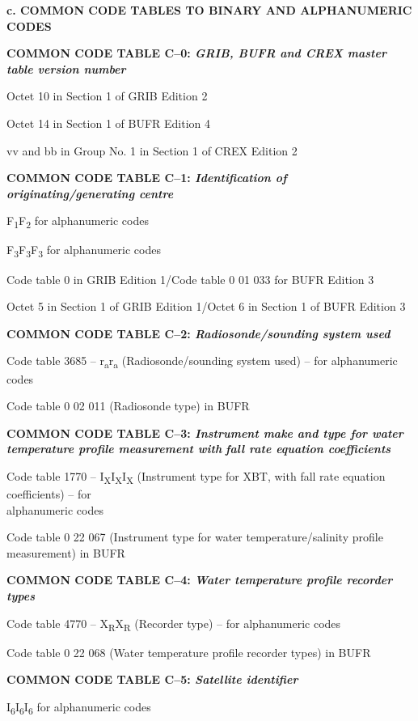 \textbf{c. COMMON CODE TABLES TO BINARY AND ALPHANUMERIC CODES}

\textbf{COMMON CODE TABLE C--0: \emph{GRIB, BUFR and CREX master table version number}}

Octet 10 in Section 1 of GRIB Edition 2

Octet 14 in Section 1 of BUFR Edition 4

vv and bb in Group No. 1 in Section 1 of CREX Edition 2

\textbf{COMMON CODE TABLE C--1: \emph{Identification of originating/generating centre}}

F\textsubscript{1}F\textsubscript{2} for alphanumeric codes

F\textsubscript{3}F\textsubscript{3}F\textsubscript{3} for alphanumeric codes

Code table 0 in GRIB Edition 1/Code table 0 01 033 for BUFR Edition 3

Octet 5 in Section 1 of GRIB Edition 1/Octet 6 in Section 1 of BUFR Edition 3

\textbf{COMMON CODE TABLE C--2: \emph{Radiosonde/sounding system used}}

Code table 3685 -- r\textsubscript{a}r\textsubscript{a} (Radiosonde/sounding system used) -- for alphanumeric codes

Code table 0 02 011 (Radiosonde type) in BUFR

\textbf{COMMON CODE TABLE C--3: \emph{Instrument make and type for water temperature profile measurement with}} \emph{\textbf{fall rate equation coefficients}}

Code table 1770 -- I\textsubscript{X}I\textsubscript{X}I\textsubscript{X} (Instrument type for XBT, with fall rate equation coefficients) -- for\\
alphanumeric codes

Code table 0 22 067 (Instrument type for water temperature/salinity profile measurement) in BUFR

\textbf{COMMON CODE TABLE C--4: \emph{Water temperature profile recorder types}}

Code table 4770 -- X\textsubscript{R}X\textsubscript{R} (Recorder type) -- for alphanumeric codes

Code table 0 22 068 (Water temperature profile recorder types) in BUFR

\textbf{COMMON CODE TABLE C--5: \emph{Satellite identifier}}

I\textsubscript{6}I\textsubscript{6}I\textsubscript{6} for alphanumeric codes

